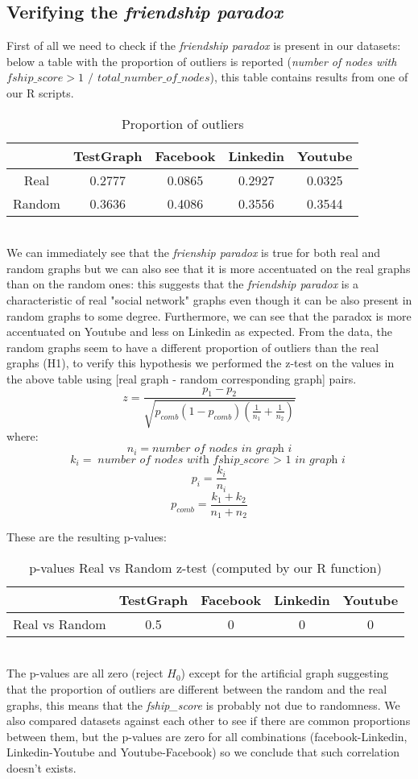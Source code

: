 \documentclass{article}
\begin{document}
\subsection{Verifying the \textit{friendship paradox}}
First of all we need to check if the \textit{friendship paradox} is present in our datasets: below a table with the proportion of outliers is reported (\textit{number of nodes with $fship\_score > 1$ $/$ $total\_number\_of\_nodes$}), this table contains results from one of our R scripts. 
\begin{table}[ht]
\centering
\begin{tabular}{|c|c|c|c|c|}
\hline
& TestGraph & Facebook & Linkedin & Youtube \\ \hline
Real & 0.2777 & 0.0865 & 0.2927 & 0.0325\\ \hline
Random & 0.3636 & 0.4086 & 0.3556 & 0.3544 \\ \hline
\end{tabular}
\caption{Proportion of outliers}
\end{table} 
\\

We can immediately see that the \textit{frienship paradox} is true for both real and random graphs but we can also see that it is more accentuated on the real graphs than on the random ones: this suggests that the \textit{friendship paradox} is a characteristic of real "social network" graphs even though it can be also present in random graphs to some degree. Furthermore, we can see that the paradox is more accentuated on Youtube and less on Linkedin as expected. From the data, the random graphs seem to have a different proportion of outliers than the real graphs (H1), to verify this hypothesis we performed the z-test on the values in the above table using [real graph - random corresponding graph] pairs.
\[z = \frac{p_1 - p_2}{\sqrt{p_{comb} (1 - p_{comb}) \left( \frac{1}{n_1} + \frac{1}{n_2} \right)}}\]
where:
\[n_i = \textit{number of nodes in graph i}\]
\[k_i = \textit{number of nodes with fship\_score $>$ 1 in graph i}\]
\[p_i = \frac{k_i}{n_i}\]
\[p_{comb} = \frac{k_1 + k_2}{n_1 + n_2}\]


These are the resulting p-values: \\
\begin{table}[ht]
\centering
\begin{tabular}{|c|c|c|c|c|}
\hline
& TestGraph & Facebook & Linkedin & Youtube \\ \hline
Real vs Random & 0.5 & 0 & 0 & 0\\ \hline
\end{tabular}
\caption{p-values Real vs Random z-test (computed by our R function)}
\end{table} 
\\
The p-values are all zero (reject \(H_0\)) except for the artificial graph suggesting that the proportion of outliers are different between the random and the real graphs, this means that the \textit{fship\_score} is probably not due to randomness. We also compared datasets against each other to see if there are common proportions between them, but the p-values are zero for all combinations (facebook-Linkedin, Linkedin-Youtube and Youtube-Facebook) so we conclude that such correlation doesn't exists.
\end{document}
